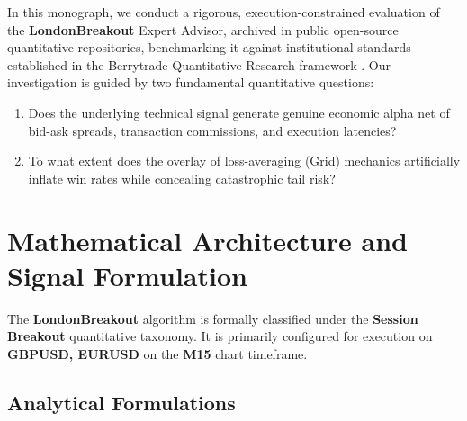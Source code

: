 \documentclass[11pt,a4paper]{article}
\begin{document}
In this monograph, we conduct a rigorous, execution-constrained evaluation of the \textbf{LondonBreakout} Expert Advisor, archived in public open-source quantitative repositories, benchmarking it against institutional standards established in the Berrytrade Quantitative Research framework \cite{artsu2026illusion}. Our investigation is guided by two fundamental quantitative questions:
\begin{enumerate}
    \item Does the underlying technical signal generate genuine economic alpha net of bid-ask spreads, transaction commissions, and execution latencies?
    \item To what extent does the overlay of loss-averaging (Grid) mechanics artificially inflate win rates while concealing catastrophic tail risk?
\end{enumerate}

\section{Mathematical Architecture and Signal Formulation}
The \textbf{LondonBreakout} algorithm is formally classified under the \textbf{Session Breakout} quantitative taxonomy. It is primarily configured for execution on \textbf{GBPUSD, EURUSD} on the \textbf{M15} chart timeframe.

\subsection{Analytical Formulations}
\end{document}
